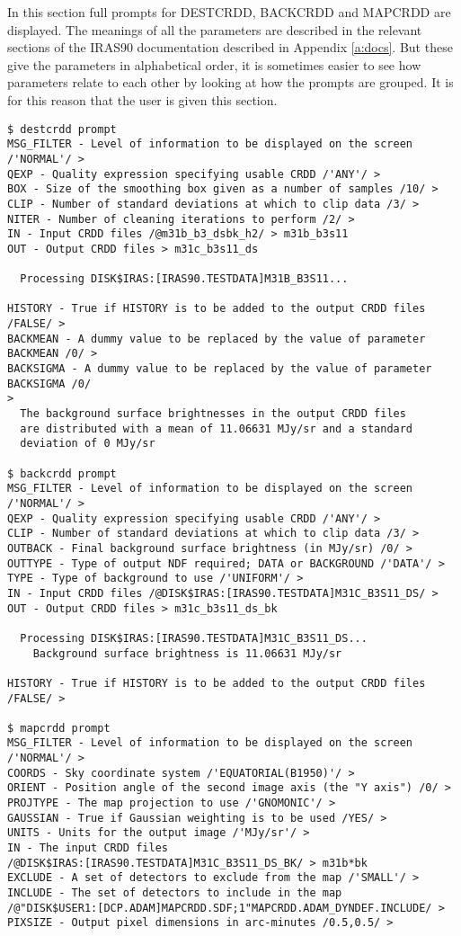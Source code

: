 In this section full prompts for DESTCRDD, BACKCRDD and MAPCRDD are displayed.
The meanings of all the parameters are described in the relevant sections of
the IRAS90 documentation described in Appendix \ref{a:docs}. But these give the 
parameters in alphabetical order, it is sometimes easier to see how parameters
relate to each other by looking at how the prompts are grouped. It is for this 
reason that the user is given this section.
\begin{small}
\begin{verbatim}
$ destcrdd prompt
MSG_FILTER - Level of information to be displayed on the screen /'NORMAL'/ > 
QEXP - Quality expression specifying usable CRDD /'ANY'/ > 
BOX - Size of the smoothing box given as a number of samples /10/ > 
CLIP - Number of standard deviations at which to clip data /3/ > 
NITER - Number of cleaning iterations to perform /2/ > 
IN - Input CRDD files /@m31b_b3_dsbk_h2/ > m31b_b3s11
OUT - Output CRDD files > m31c_b3s11_ds

  Processing DISK$IRAS:[IRAS90.TESTDATA]M31B_B3S11...

HISTORY - True if HISTORY is to be added to the output CRDD files /FALSE/ > 
BACKMEAN - A dummy value to be replaced by the value of parameter BACKMEAN /0/ >
BACKSIGMA - A dummy value to be replaced by the value of parameter BACKSIGMA /0/
> 
  The background surface brightnesses in the output CRDD files
  are distributed with a mean of 11.06631 MJy/sr and a standard
  deviation of 0 MJy/sr

$ backcrdd prompt
MSG_FILTER - Level of information to be displayed on the screen /'NORMAL'/ > 
QEXP - Quality expression specifying usable CRDD /'ANY'/ > 
CLIP - Number of standard deviations at which to clip data /3/ > 
OUTBACK - Final background surface brightness (in MJy/sr) /0/ > 
OUTTYPE - Type of output NDF required; DATA or BACKGROUND /'DATA'/ > 
TYPE - Type of background to use /'UNIFORM'/ > 
IN - Input CRDD files /@DISK$IRAS:[IRAS90.TESTDATA]M31C_B3S11_DS/ >
OUT - Output CRDD files > m31c_b3s11_ds_bk

  Processing DISK$IRAS:[IRAS90.TESTDATA]M31C_B3S11_DS...
    Background surface brightness is 11.06631 MJy/sr

HISTORY - True if HISTORY is to be added to the output CRDD files /FALSE/ > 

$ mapcrdd prompt
MSG_FILTER - Level of information to be displayed on the screen /'NORMAL'/ > 
COORDS - Sky coordinate system /'EQUATORIAL(B1950)'/ > 
ORIENT - Position angle of the second image axis (the "Y axis") /0/ > 
PROJTYPE - The map projection to use /'GNOMONIC'/ > 
GAUSSIAN - True if Gaussian weighting is to be used /YES/ >
UNITS - Units for the output image /'MJy/sr'/ > 
IN - The input CRDD files
/@DISK$IRAS:[IRAS90.TESTDATA]M31C_B3S11_DS_BK/ > m31b*bk
EXCLUDE - A set of detectors to exclude from the map /'SMALL'/ > 
INCLUDE - The set of detectors to include in the map
/@"DISK$USER1:[DCP.ADAM]MAPCRDD.SDF;1"MAPCRDD.ADAM_DYNDEF.INCLUDE/ >
PIXSIZE - Output pixel dimensions in arc-minutes /0.5,0.5/ > 


\end{verbatim}
\end{small}
